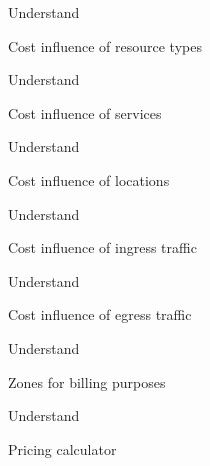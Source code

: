 \documentclass{scrartcl}
\newenvironment{flashcard}[2][]{%
    #1
    \vfill
    \centerline{\Large{#2}}
    \vfill
    \newpage
}
{\newpage}
\begin{document}
    \begin{flashcard}[Understand]{Cost influence of resource types}

    \end{flashcard}

    \begin{flashcard}[Understand]{Cost influence of services}

    \end{flashcard}

    \begin{flashcard}[Understand]{Cost influence of locations}

    \end{flashcard}

    \begin{flashcard}[Understand]{Cost influence of ingress traffic}

    \end{flashcard}

    \begin{flashcard}[Understand]{Cost influence of egress traffic}

    \end{flashcard}

    \begin{flashcard}[Understand]{Zones for billing purposes}

    \end{flashcard}

    \begin{flashcard}[Understand]{Pricing calculator}

    \end{flashcard}
\end{document}
